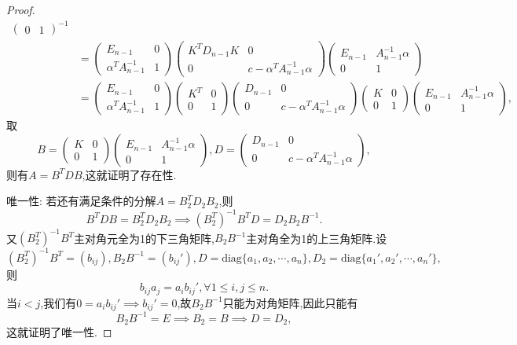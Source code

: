 \documentclass[../../main.tex]{subfiles}
\begin{document}
\begin{proof}
\[\begin{aligned}
\begin{pmatrix}
0 & 1
\end{pmatrix}^{-1} \\
&= \begin{pmatrix}
E_{n - 1} & 0 \\
\alpha^T A_{n - 1}^{-1} & 1
\end{pmatrix} \begin{pmatrix}
K^T D_{n - 1} K & 0 \\
0 & c - \alpha^T A_{n - 1}^{-1} \alpha
\end{pmatrix} \begin{pmatrix}
E_{n - 1} & A_{n - 1}^{-1} \alpha \\
0 & 1
\end{pmatrix} \\
&= \begin{pmatrix}
E_{n - 1} & 0 \\
\alpha^T A_{n - 1}^{-1} & 1
\end{pmatrix} \begin{pmatrix}
K^T & 0 \\
0 & 1
\end{pmatrix} \begin{pmatrix}
D_{n - 1} & 0 \\
0 & c - \alpha^T A_{n - 1}^{-1} \alpha
\end{pmatrix} \begin{pmatrix}
K & 0 \\
0 & 1
\end{pmatrix} \begin{pmatrix}
E_{n - 1} & A_{n - 1}^{-1} \alpha \\
0 & 1
\end{pmatrix},
\end{aligned}
\]
取
\[
B = \begin{pmatrix}
K & 0 \\
0 & 1
\end{pmatrix} \begin{pmatrix}
E_{n - 1} & A_{n - 1}^{-1} \alpha \\
0 & 1
\end{pmatrix}, D = \begin{pmatrix}
D_{n - 1} & 0 \\
0 & c - \alpha^T A_{n - 1}^{-1} \alpha
\end{pmatrix},
\]
则有\( A = B^T D B \),这就证明了存在性.

{\heiti 唯一性:} 若还有满足条件的分解\( A = B_2^T D_2 B_2 \),则
\[
B^T D B = B_2^T D_2 B_2 \implies (B_2^T)^{-1} B^T D = D_2 B_2 B^{-1}.
\]
又\( (B_2^T)^{-1} B^T \)主对角元全为1的下三角矩阵,\( B_2 B^{-1} \)主对角全为1的上三角矩阵.设
\[
(B_2^T)^{-1} B^T = (b_{ij}), B_2 B^{-1} = (b_{ij}'), D = \text{diag}\{a_1, a_2, \cdots, a_n\}, D_2 = \text{diag}\{a_1', a_2', \cdots, a_n'\},
\]
则
\[
b_{ij} a_j = a_i b_{ij}', \forall 1 \leqslant  i, j \leqslant  n.
\]
当\( i < j \),我们有\( 0 = a_i b_{ij}' \implies b_{ij}' = 0 \),故\( B_2 B^{-1} \)只能为对角矩阵,因此只能有
\[
B_2 B^{-1} = E \implies B_2 = B \implies D = D_2,
\]
这就证明了唯一性.
\end{proof}
\end{document}
